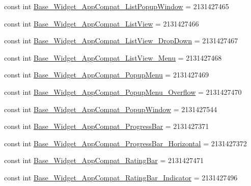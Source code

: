 \begin{DoxyCompactItemize}
const int \mbox{\hyperlink{class_f_w_p_s___app_1_1_droid_1_1_resource_1_1_style_a3a1d63dd98c8a78bda5b2e91cff75c38}{Base\+\_\+\+Widget\+\_\+\+App\+Compat\+\_\+\+List\+Popup\+Window}} = 2131427465
\item 
const int \mbox{\hyperlink{class_f_w_p_s___app_1_1_droid_1_1_resource_1_1_style_a6a5083573172b57b2c893503d1f0b752}{Base\+\_\+\+Widget\+\_\+\+App\+Compat\+\_\+\+List\+View}} = 2131427466
\item 
const int \mbox{\hyperlink{class_f_w_p_s___app_1_1_droid_1_1_resource_1_1_style_aaec9d78a51f02f7c77083a409f988bd9}{Base\+\_\+\+Widget\+\_\+\+App\+Compat\+\_\+\+List\+View\+\_\+\+Drop\+Down}} = 2131427467
\item 
const int \mbox{\hyperlink{class_f_w_p_s___app_1_1_droid_1_1_resource_1_1_style_a36725450d3cf5ae8e96ff48cda4c0ee6}{Base\+\_\+\+Widget\+\_\+\+App\+Compat\+\_\+\+List\+View\+\_\+\+Menu}} = 2131427468
\item 
const int \mbox{\hyperlink{class_f_w_p_s___app_1_1_droid_1_1_resource_1_1_style_a784cec2a4cca4d06a017507c0be939ee}{Base\+\_\+\+Widget\+\_\+\+App\+Compat\+\_\+\+Popup\+Menu}} = 2131427469
\item 
const int \mbox{\hyperlink{class_f_w_p_s___app_1_1_droid_1_1_resource_1_1_style_aadc293f3638b96d3309538d9e70fba8d}{Base\+\_\+\+Widget\+\_\+\+App\+Compat\+\_\+\+Popup\+Menu\+\_\+\+Overflow}} = 2131427470
\item 
const int \mbox{\hyperlink{class_f_w_p_s___app_1_1_droid_1_1_resource_1_1_style_a65d215a91606664a701a1c33fd534264}{Base\+\_\+\+Widget\+\_\+\+App\+Compat\+\_\+\+Popup\+Window}} = 2131427544
\item 
const int \mbox{\hyperlink{class_f_w_p_s___app_1_1_droid_1_1_resource_1_1_style_abc34d51a68438de8e57686e20bc7988c}{Base\+\_\+\+Widget\+\_\+\+App\+Compat\+\_\+\+Progress\+Bar}} = 2131427371
\item 
const int \mbox{\hyperlink{class_f_w_p_s___app_1_1_droid_1_1_resource_1_1_style_a07f26c0476dc10d5bebace642d291745}{Base\+\_\+\+Widget\+\_\+\+App\+Compat\+\_\+\+Progress\+Bar\+\_\+\+Horizontal}} = 2131427372
\item 
const int \mbox{\hyperlink{class_f_w_p_s___app_1_1_droid_1_1_resource_1_1_style_a348161777b80ccf6aa28a81341d240b5}{Base\+\_\+\+Widget\+\_\+\+App\+Compat\+\_\+\+Rating\+Bar}} = 2131427471
\item 
const int \mbox{\hyperlink{class_f_w_p_s___app_1_1_droid_1_1_resource_1_1_style_ae703eff88e2dc113e21e374625aa1b0d}{Base\+\_\+\+Widget\+\_\+\+App\+Compat\+\_\+\+Rating\+Bar\+\_\+\+Indicator}} = 2131427496

\end{DoxyCompactItemize}
